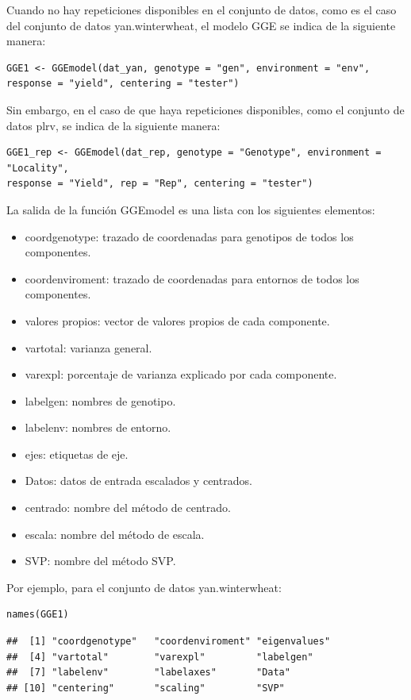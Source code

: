 Cuando no hay repeticiones disponibles en el conjunto de datos, como es el caso del conjunto de datos yan.winterwheat, el modelo GGE se indica de la siguiente manera:


\begin{lstlisting}
GGE1 <- GGEmodel(dat_yan, genotype = "gen", environment = "env", 
response = "yield", centering = "tester")
\end{lstlisting}


Sin embargo, en el caso de que haya repeticiones disponibles, como el conjunto de datos plrv, se indica de la siguiente manera:


\begin{lstlisting}
GGE1_rep <- GGEmodel(dat_rep, genotype = "Genotype", environment = "Locality", 
response = "Yield", rep = "Rep", centering = "tester")
\end{lstlisting}


La salida de la función GGEmodel es una lista con los siguientes elementos:


\begin{itemize}
\item coordgenotype: trazado de coordenadas para genotipos de todos los componentes.
\item coordenviroment: trazado de coordenadas para entornos de todos los componentes.
\item valores propios: vector de valores propios de cada componente.
\item vartotal: varianza general.
\item varexpl: porcentaje de varianza explicado por cada componente.
\item labelgen: nombres de genotipo.
\item labelenv: nombres de entorno.
\item ejes: etiquetas de eje.
\item Datos: datos de entrada escalados y centrados.
\item centrado: nombre del método de centrado.
\item escala: nombre del método de escala.
\item SVP: nombre del método SVP.
\end{itemize}


Por ejemplo, para el conjunto de datos yan.winterwheat:


\begin{lstlisting}
names(GGE1)
\end{lstlisting}

\begin{verbatim}
##  [1] "coordgenotype"   "coordenviroment" "eigenvalues"    
##  [4] "vartotal"        "varexpl"         "labelgen"       
##  [7] "labelenv"        "labelaxes"       "Data"           
## [10] "centering"       "scaling"         "SVP"
\end{verbatim}

